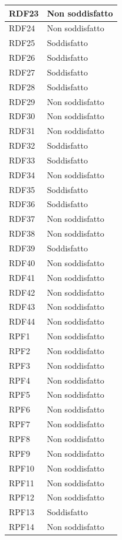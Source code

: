\begin{longtable}{| p{2.5cm} | p{3cm} |}
	RDF23 & Non soddisfatto \\ \hline
	RDF24 & Non soddisfatto \\ \hline
	RDF25 & Soddisfatto \\ \hline
	RDF26 & Soddisfatto \\ \hline
	RDF27 & Soddisfatto \\ \hline
	RDF28 & Soddisfatto \\ \hline
	RDF29 & Non soddisfatto \\ \hline
	RDF30 & Non soddisfatto \\ \hline
	RDF31 & Non soddisfatto \\ \hline
	RDF32 & Soddisfatto \\ \hline
	RDF33 & Soddisfatto \\ \hline
	RDF34 & Non soddisfatto \\ \hline
	RDF35 & Soddisfatto \\ \hline
	RDF36 & Soddisfatto \\ \hline
	RDF37 & Non soddisfatto \\ \hline
	RDF38 & Non soddisfatto \\ \hline
	RDF39 & Soddisfatto \\ \hline
	RDF40 & Non soddisfatto \\ \hline
	RDF41 & Non soddisfatto \\ \hline
	RDF42 & Non soddisfatto \\ \hline
	RDF43 & Non soddisfatto \\ \hline
	RDF44 & Non soddisfatto \\ \hline
	RPF1 & Non soddisfatto \\ \hline
	RPF2 & Non soddisfatto \\ \hline
	RPF3 & Non soddisfatto \\ \hline
	RPF4 & Non soddisfatto \\ \hline
	RPF5 & Non soddisfatto \\ \hline
	RPF6 & Non soddisfatto \\ \hline
	RPF7 & Non soddisfatto \\ \hline
	RPF8 & Non soddisfatto \\ \hline
	RPF9 & Non soddisfatto \\ \hline
	RPF10 & Non soddisfatto \\ \hline
	RPF11 & Non soddisfatto \\ \hline
	RPF12 & Non soddisfatto \\ \hline
	RPF13 & Soddisfatto \\ \hline
	RPF14 & Non soddisfatto \\ \hline

\end{longtable}
